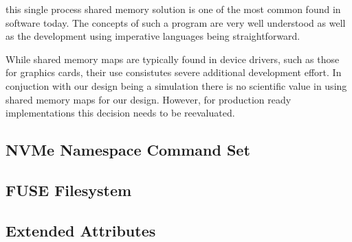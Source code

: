 this single process shared memory solution is one of the most common found in
software today. The concepts of such a program are very well understood as
well as the development using imperative languages being straightforward.

While shared memory maps are typically found in device drivers, such as those
for graphics cards, their use consistutes severe additional development effort.
In conjuction with our design being a simulation there is no scientific value in
using shared memory maps for our design. However, for production ready
implementations this decision needs to be reevaluated.

\subsection{NVMe Namespace Command Set}



\subsection{FUSE Filesystem}


\subsection{Extended Attributes}


